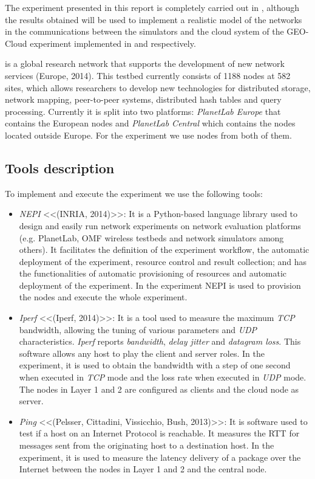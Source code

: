The experiment presented in this report is completely carried out in \pl, although the results obtained will be used to implement a realistic model of the networks in the communications between the simulators and the cloud system of the GEO-Cloud experiment implemented in \vw and \bonfire respectively.

\pl is a global research network that supports the development of new network
services (Europe, 2014). This testbed currently consists of 1188 nodes at 582
sites, which allows researchers to develop new technologies for distributed
storage, network mapping, peer-to-peer systems, distributed hash tables and
query processing. Currently it is split into two platforms: \emph{PlanetLab
  Europe} that contains the European nodes and \emph{PlanetLab Central} which
contains the nodes located outside Europe.
For the experiment we use nodes from both of them.

\subsection{Tools description}

To implement and execute the experiment we use the following tools:
\begin{itemize}
\item \emph{NEPI} <<(INRIA, 2014)>>: It is a Python-based language library used to design and easily run network experiments on network evaluation platforms (e.g. PlanetLab, OMF wireless testbeds and network simulators among others). It facilitates the definition of the experiment workflow, the automatic deployment of the experiment, resource control and result collection; and has the functionalities of automatic provisioning of resources and automatic deployment of the experiment. In the experiment NEPI is used to provision the nodes and execute the whole experiment.
\item \emph{Iperf} <<(Iperf, 2014)>>: It is a tool used to measure the maximum \emph{TCP} bandwidth, allowing the tuning of various parameters and \emph{UDP} characteristics. \emph{Iperf} reports \emph{bandwidth}, \emph{delay jitter} and \emph{datagram loss}. This software allows any host to play the client and server roles. In the experiment, it is used to obtain the bandwidth with a step of one second when executed in \emph{TCP} mode and the loss rate when executed in \emph{UDP} mode. The nodes in Layer 1 and 2 are configured as clients and the cloud node as server.
\item \emph{Ping} <<(Pelsser, Cittadini, Vissicchio, Bush, 2013)>>: It is
  software used to test if a host on an Internet Protocol is reachable. It
  measures the \ac{RTT} for messages sent from the originating host to a
  destination host. In the experiment, it is used to measure the latency
  delivery  of a package over the Internet between the nodes in Layer 1 and 2 and the central node.
\end{itemize}

